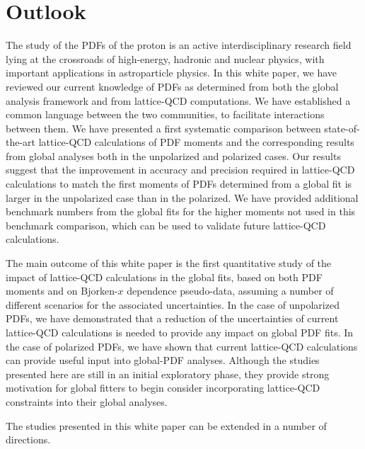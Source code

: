 \section{Outlook}
\label{sec:outlook}

The study of the PDFs of the proton is an active interdisciplinary research 
field lying at the crossroads of high-energy, hadronic and nuclear physics, 
with important applications in astroparticle physics.
%
In this white paper, we have reviewed our current knowledge of PDFs as
determined from both the global analysis framework
and from lattice-QCD computations. 
%
We have established a common language between the two communities, 
to facilitate interactions between them.
%
We have presented a first systematic comparison between state-of-the-art 
lattice-QCD calculations of PDF moments and the corresponding results from
global analyses both in the unpolarized and polarized cases.
%
Our results suggest that the improvement in accuracy and precision required 
in lattice-QCD calculations to match the first moments of PDFs 
determined from a global fit is larger in the unpolarized case than in the 
polarized.
%
We have provided additional benchmark numbers from the global fits 
for the higher moments not used in this benchmark comparison, which can be
used to validate future lattice-QCD calculations.

The main outcome of this white paper is the first
quantitative study of the impact of lattice-QCD calculations
in the global fits, based on both PDF moments and on Bjorken-$x$ dependence 
pseudo-data, assuming a number of different scenarios for
the associated uncertainties.
%
In the case of unpolarized PDFs, we have demonstrated that a reduction 
of the uncertainties of current lattice-QCD calculations is needed 
to provide any impact on global PDF fits.
%
In the case of polarized PDFs, we have shown that current lattice-QCD
calculations can provide useful input into global-PDF analyses.
%
Although the studies presented here are still in an initial exploratory phase, 
they provide strong motivation for global fitters to begin consider 
incorporating lattice-QCD constraints into their global analyses.

The studies presented in this white paper can be extended in a number of 
directions.

